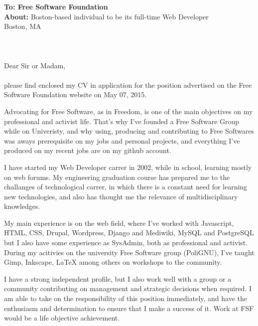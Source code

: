 \documentclass[]{friggeri-cover-letter}
\begin{document}
\thispagestyle{empty}
%
%

\textbf{To: Free Software Foundation}\\
\textbf{About:} Boston-based individual to be its full-time Web Developer\\
Boston, MA\\
~\\
~\\
~\\
Dear Sir or Madam,\\
~\\
please find enclosed my CV in application for the position advertised on the Free Software Foundation website on May 07, 2015.

Advocating for Free Software, as in Freedom, is one of the main objectives on my professional and activist life.
That's why I've founded a Free Software Group while on Univeristy, and why using, producing and contributing to Free Softwares was aways prerequisite on my jobs and personal projects, and everything I've produced on my recent jobs are on my github account.

I have started my Web Developer carrer in 2002, while in school, learning mostly on web forums. My engineering graduation course has prepared me to the challanges of technological carrer, in which there is a constant need for learning new technologies, and also has thought me the relevance of multidisciplinary knowledges.  

My main experience is on the web field, where I've worked with Javascript, HTML, CSS, Drupal, Wordpress, Django and Mediwiki, MySQL and PostgreSQL but I also have some experience as SysAdmin, both as professional and activist.
During my acitivies on the university Free Software group (PoliGNU), I've taught Gimp, Inkscape, LaTeX among others on workshops to the community.

I have a strong independent profile, but I also work well with a group or a community contributing on management and strategic decisions when required. I am able to take on the responsibility of this position immediately, and have the enthusiasm and determination to ensure that I make a success of it. Work at FSF would be a life objective achievement. 
\end{document}
